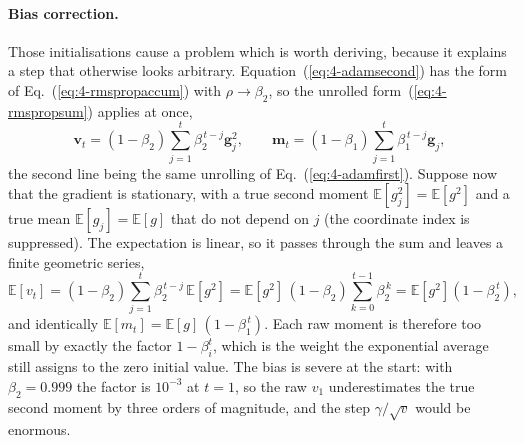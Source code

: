 \paragraph{Bias correction.}
Those initialisations cause a problem which is worth deriving, because it
explains a step that otherwise looks arbitrary.  Equation~(\ref{eq:4-adamsecond})
has the form of Eq.~(\ref{eq:4-rmspropaccum}) with $\rho\to\beta_2$, so the
unrolled form~(\ref{eq:4-rmspropsum}) applies at once,
\[
  \bm{v}_t=(1-\beta_2)\sum_{j=1}^{t}\beta_2^{\,t-j}\bm{g}_j^{2},
  \qquad
  \bm{m}_t=(1-\beta_1)\sum_{j=1}^{t}\beta_1^{\,t-j}\bm{g}_j ,
\]
the second line being the same unrolling of Eq.~(\ref{eq:4-adamfirst}).
Suppose now that the gradient is stationary, with a true second moment
$\mathbb{E}[g_j^{2}]=\mathbb{E}[g^{2}]$ and a true mean
$\mathbb{E}[g_j]=\mathbb{E}[g]$ that do not depend on $j$ (the coordinate
index is suppressed).  The expectation is linear, so it passes through the
sum and leaves a finite geometric series,
\begin{equation}
  \mathbb{E}[v_t] = (1-\beta_2)\sum_{j=1}^{t}\beta_2^{\,t-j}\,\mathbb{E}[g^{2}]
   = \mathbb{E}[g^{2}]\,(1-\beta_2)\sum_{k=0}^{t-1}\beta_2^{\,k}
   = \mathbb{E}[g^{2}]\left(1-\beta_2^{\,t}\right),
  \label{eq:4-adambiasderiv}
\end{equation}
and identically $\mathbb{E}[m_t]=\mathbb{E}[g]\,(1-\beta_1^{\,t})$.  Each raw
moment is therefore too small by exactly the factor $1-\beta_i^{t}$, which is
the weight the exponential average still assigns to the zero initial value.
The bias is severe at the start: with $\beta_2=0.999$ the factor is $10^{-3}$
at $t=1$, so the raw $v_1$ underestimates the true second moment by three
orders of magnitude, and the step $\gamma/\sqrt{v}$ would be enormous.

